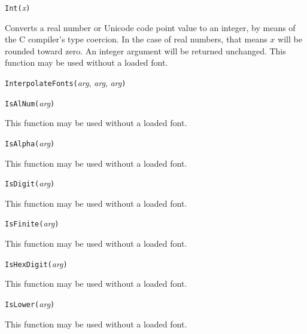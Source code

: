 

\texttt{Int(}\textit{x}\texttt{)}

Converts a real number or Unicode code point value to an integer, by means
of the C compiler's type coercion.  In the case of real numbers, that means
$x$ will be rounded toward zero.  An integer argument will be returned
unchanged.
This function may be used without a loaded font.



\texttt{InterpolateFonts(}\textit{arg}, \textit{arg}, \textit{arg}\texttt{)}



\texttt{IsAlNum(}\textit{arg}\texttt{)}

This function may be used without a loaded font.



\texttt{IsAlpha(}\textit{arg}\texttt{)}

This function may be used without a loaded font.



\texttt{IsDigit(}\textit{arg}\texttt{)}

This function may be used without a loaded font.



\texttt{IsFinite(}\textit{arg}\texttt{)}

This function may be used without a loaded font.



\texttt{IsHexDigit(}\textit{arg}\texttt{)}

This function may be used without a loaded font.



\texttt{IsLower(}\textit{arg}\texttt{)}

This function may be used without a loaded font.

